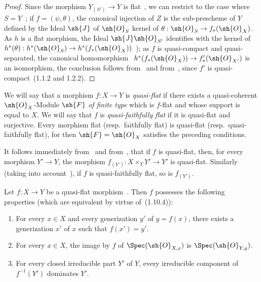 \begin{proof}
Since the morphism $Y_{(S')}\to Y$ is flat~, we can restrict to the case where $S=Y$~; if $f=(\psi,\theta)$, the canonical injection of $Z$ is the sub-prescheme of $Y$ defined by the Ideal $\sh{J}$ of $\sh{O}_S$ kernel of $\theta:{\sh{O}_S}\to f_*(\sh{O}_X)$.
As $h$ is a flat morphism, the Ideal $\sh{J}\sh{O}_{S'}$ identifies with the kernel of $h^*(\theta):h^*(\sh{O}_S)\to h^*(f_*(\sh{O}_X))$~); as $f$ is quasi-compact and quasi-separated, the canonical homomorphism~ $h^*(f_*(\sh{O}_X))\to f'_*(\sh{O}_{X'})$ is an isomorphism, the conclusion follows from~ and from~, since $f'$ is quasi-compact~(1.1.2 and 1.2.2).
\end{proof}

\begin{env}[2.3.3]
\label{IV.2.3.3}
We will say that a morphism $f:X\to Y$ is \emph{quasi-flat} if there exists a quasi-coherent $\sh{O}_X$-Module $\sh{F}$ \emph{of finite type} which is $f$-flat and whose support is equal to $X$.
We will say that $f$ is \emph{quasi-faithfully flat} if it is quasi-flat and surjective.
Every morphism flat (resp.\ faithfully flat) is quasi-flat (resp.\ quasi-faithfully flat), for then $\sh{F}=\sh{O}_X$ satisfies the preceding conditions.
\end{env}

It follows immediately from~ and from~, that if $f$ is quasi-flat, then, for every morphism $Y'\to Y$, the morphism $f_{(Y')}:X\times_Y Y'\to Y'$ is quasi-flat.
Similarly (taking into account~), if $f$ is quasi-faithfully flat, so is $f_{(Y')}$.

\begin{proposition}[2.3.4]
\label{IV.2.3.4}
Let $f:X\to Y$ be a quasi-flat morphism~. Then $f$ possesses the following properties \textnormal{(}which are equivalent by virtue of~(1.10.4)\textnormal{)}:
\begin{enumerate}[label=(\roman*)]
  \item For every $x\in X$ and every generization $y'$ of $y=f(x)$, there exists a generization $x'$ of $x$ such that $f(x')=y'$.
  \item For every $x\in X$, the image by $f$ of $\Spec(\sh{O}_{X,x})$ is $\Spec(\sh{O}_{Y,y})$.
  \item[\emph{(iii)}] For every closed irreducible part $Y'$ of $Y$, every irreducible component of $f^{-1}(Y')$ dominates $Y'$.
\end{enumerate}
\end{proposition}

